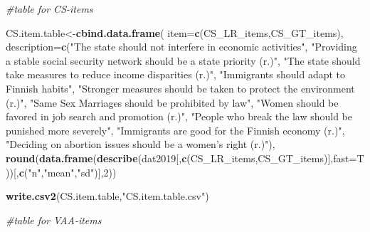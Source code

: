 \documentclass[
]{article}
\newenvironment{Shaded}{\begin{snugshade}}{\end{snugshade}}
\newcommand{\CommentTok}[1]{\textcolor[rgb]{0.56,0.35,0.01}{\textit{#1}}}
\newcommand{\DataTypeTok}[1]{\textcolor[rgb]{0.13,0.29,0.53}{#1}}
\newcommand{\DecValTok}[1]{\textcolor[rgb]{0.00,0.00,0.81}{#1}}
\newcommand{\KeywordTok}[1]{\textcolor[rgb]{0.13,0.29,0.53}{\textbf{#1}}}
\newcommand{\NormalTok}[1]{#1}
\newcommand{\StringTok}[1]{\textcolor[rgb]{0.31,0.60,0.02}{#1}}
\begin{document}
\begin{Shaded}
\begin{Highlighting}[]
\CommentTok{#table for CS-items}

\NormalTok{CS.item.table<-}\KeywordTok{cbind.data.frame}\NormalTok{(}
  \DataTypeTok{item=}\KeywordTok{c}\NormalTok{(CS_LR_items,CS_GT_items),}
  \DataTypeTok{description=}\KeywordTok{c}\NormalTok{(}\StringTok{"The state should not interfere in economic activities"}\NormalTok{,}
                \StringTok{"Providing a stable social security network should be a state priority (r.)"}\NormalTok{,}
                \StringTok{"The state should take measures to reduce income disparities (r.)"}\NormalTok{,}
                \StringTok{"Immigrants should adapt to Finnish habits"}\NormalTok{,}
                \StringTok{"Stronger measures should be taken to protect the environment (r.)"}\NormalTok{,}
                \StringTok{"Same Sex Marriages should be prohibited by law"}\NormalTok{,}
                \StringTok{"Women should be favored in job search and promotion (r.)"}\NormalTok{,}
                \StringTok{"People who break the law should be punished more severely"}\NormalTok{,}
                \StringTok{"Immigrants are good for the Finnish economy (r.)"}\NormalTok{,}
                \StringTok{"Deciding on abortion issues should be a women's right (r.)"}\NormalTok{),}
  \KeywordTok{round}\NormalTok{(}\KeywordTok{data.frame}\NormalTok{(}\KeywordTok{describe}\NormalTok{(dat2019[,}\KeywordTok{c}\NormalTok{(CS_LR_items,CS_GT_items)],}\DataTypeTok{fast=}\NormalTok{T))[,}\KeywordTok{c}\NormalTok{(}\StringTok{"n"}\NormalTok{,}\StringTok{"mean"}\NormalTok{,}\StringTok{"sd"}\NormalTok{)],}\DecValTok{2}\NormalTok{))}

\KeywordTok{write.csv2}\NormalTok{(CS.item.table,}\StringTok{"CS.item.table.csv"}\NormalTok{)}

\CommentTok{#table for VAA-items}


\end{Highlighting}
\end{Shaded}
\end{document}
